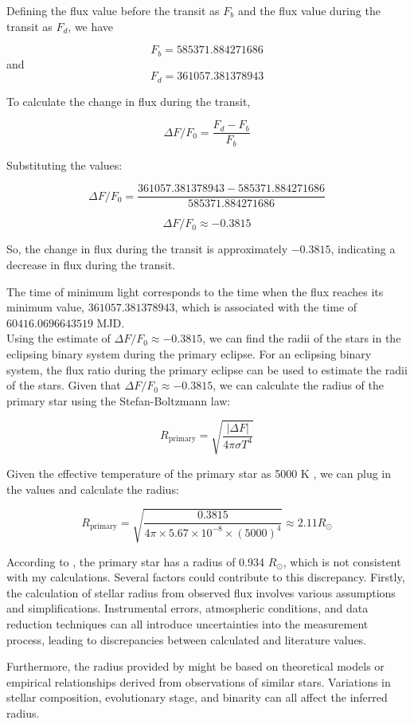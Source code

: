 \documentclass[]{aastex63}
\begin{document}
Defining the flux value before the transit as $F_b$ and the flux value during the transit as $F_d$, we have

\[
F_b = 585371.884271686
\]
and
\[
F_d = 361057.381378943
\]

To calculate the change in flux during the transit,

\[
\Delta F/F_0 = \frac{F_d - F_b}{F_b}
\]

Substituting the values:

\[
\Delta F/F_0 = \frac{361057.381378943 - 585371.884271686}{585371.884271686}
\]

\[
\Delta F/F_0 \approx -0.3815
\]

So, the change in flux during the transit is approximately $-0.3815$, indicating a decrease in flux during the transit.

The time of minimum light corresponds to the time when the flux reaches its minimum value, $361057.381378943$, which is associated with the time of $60416.0696643519$ MJD.
\\
Using the estimate of $\Delta F/F_0 \approx -0.3815$, we can find the radii of the stars in the eclipsing binary system during the primary eclipse.
For an eclipsing binary system, the flux ratio during the primary eclipse can be used to estimate the radii of the stars. Given that $\Delta F/F_{0} \approx -0.3815$, we can calculate the radius of the primary star using the Stefan-Boltzmann law:

\[
R_{\text{primary}} = \sqrt{\frac{|\Delta F|}{4\pi \sigma T^4}}
\]

Given the effective temperature of the primary star as 5000 K \citep{Deb}, we can plug in the values and calculate the radius:

\[
R_{\text{primary}} = \sqrt{\frac{0.3815}{4\pi \times 5.67 \times 10^{-8} \times (5000)^4}} \approx 2.11 R_{\odot}
\]

According to \cite{Deb}, the primary star has a radius of 0.934 $R_{\odot}$, which is not consistent with my calculations. Several factors could contribute to this discrepancy. Firstly, the calculation of stellar radius from observed flux involves various assumptions and simplifications. Instrumental errors, atmospheric conditions, and data reduction techniques can all introduce uncertainties into the measurement process, leading to discrepancies between calculated and literature values.

Furthermore, the radius provided by \cite{Deb} might be based on theoretical models or empirical relationships derived from observations of similar stars. Variations in stellar composition, evolutionary stage, and binarity can all affect the inferred radius.
\end{document}
